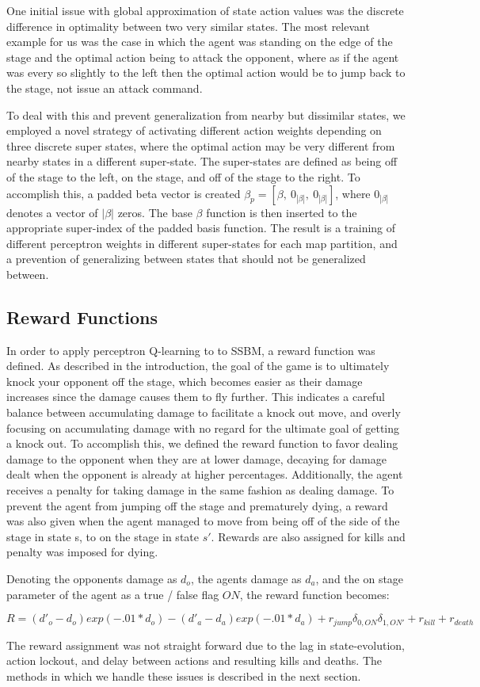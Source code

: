 One initial issue with global approximation of state action values was the discrete difference in optimality between two very similar states. The most relevant example for us was the case in which the agent was standing on the edge of the stage and the optimal action being to attack the opponent, where as if the agent was every so slightly to the left then the optimal action would be to jump back to the stage, not issue an attack command. 

To deal with this and prevent generalization from nearby but dissimilar states, we employed a novel strategy of activating different action weights depending on three discrete super states, where the optimal action may be very different from nearby states in a different super-state. The super-states are defined as being off of the stage to the left, on the stage, and off of the stage to the right. To accomplish this, a padded beta vector is created $\beta_{p} = [\beta,~0_{|\beta|},~0_{|\beta|}]$, where $0_{|\beta|}$ denotes a vector of $|\beta|$ zeros. The base $\beta$ function is then inserted to the appropriate super-index of the padded basis function. The result is a training of different perceptron weights in different super-states for each map partition, and a prevention of generalizing between states that should not be generalized between.

\subsection{Reward Functions}

In order to apply perceptron Q-learning to to SSBM, a reward function was defined. As described in the introduction, the goal of the game is to ultimately knock your opponent off the stage, which becomes easier as their damage increases since the damage causes them to fly further. This indicates a careful balance between accumulating damage to facilitate a knock out move, and overly focusing on accumulating damage with no regard for the ultimate goal of getting a knock out. To accomplish this, we defined the reward function to favor dealing damage to the opponent when they are at lower damage, decaying for damage dealt when the opponent is already at higher percentages. Additionally, the agent receives a penalty for taking damage in the same fashion as dealing damage. To prevent the agent from jumping off the stage and prematurely dying, a reward was also given when the agent managed to move from being off of the side of the stage in state s, to on the stage in state $s'$. Rewards are also assigned for kills and penalty was imposed for dying.

Denoting the opponents damage as $d_o$, the agents damage as $d_a$, and the on stage parameter of the agent as a true / false flag $ON$, the reward function becomes:

$$R = (d'_o-d_o)exp(-.01*d_o) - (d'_a-d_a)exp(-.01*d_a) + r_{jump}\delta_{0,ON}\delta_{1,ON'}  + r_{kill} + r_{death}$$

The reward assignment was not straight forward due to the lag in state-evolution, action lockout, and delay between actions and resulting kills and deaths. The methods in which we handle these issues is described in the next section.
